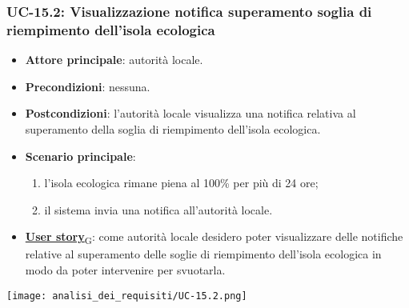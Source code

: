 \subsubsection{UC-15.2: Visualizzazione notifica superamento soglia di riempimento dell'isola ecologica}
\begin{itemize}
	\item \textbf{Attore principale}: autorità locale.
	\item \textbf{Precondizioni}: nessuna.
	\item \textbf{Postcondizioni}: l'autorità locale visualizza una notifica relativa al superamento della soglia di riempimento dell'isola ecologica.
	\item \textbf{Scenario principale}:
	      \begin{enumerate}
		      \item l'isola ecologica rimane piena al 100\% per più di 24 ore;
		      \item il sistema invia una notifica all'autorità locale.
	      \end{enumerate}
	\item \href{https://7last.github.io/docs/pb/documentazione-interna/glossario\#user-story}{\textbf{User story}\textsubscript{G}}:
	      come autorità locale desidero poter visualizzare delle notifiche relative al superamento delle soglie di riempimento dell'isola ecologica
	      in modo da poter intervenire per svuotarla.
\end{itemize}
\begin{center}
	\texttt{[image: analisi\_dei\_requisiti/UC-15.2.png]}
\end{center}

